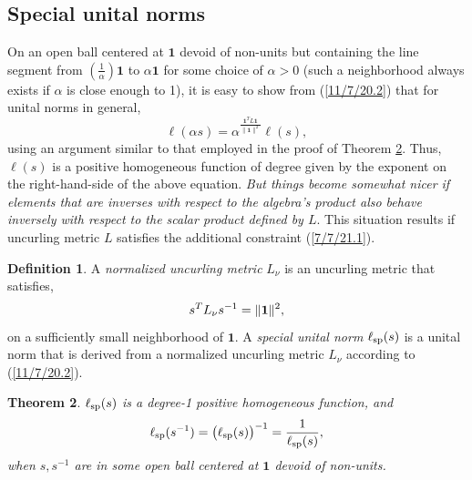 \documentclass{amsart}
\numberwithin{equation}{section}
\newtheorem{theorem}{Theorem}
\theoremstyle{definition}
\newtheorem{definition}[theorem]{Definition}
\numberwithin{theorem}{section}
\begin{document}
\subsection{Special unital norms}

On an open ball centered at $\mathbf{1}$ devoid of non-units but containing the line segment from $\left(\frac{1}{\alpha}\right)\mathbf{1}$ to $\alpha\mathbf{1}$ for some choice of $\alpha>0$ (such a neighborhood always exists if $\alpha$ is close enough to 1), it is easy to show from (\ref{11/7/20.2}) that for unital norms in general,  \[  \ell(\alpha s) = \alpha^{\frac{\mathbf{1}^T L \mathbf{1}}{\|\mathbf{1}\|^2}} \ell(s),\] using an argument similar to that employed in the proof of Theorem \ref{9/24/23.1}. Thus, $ \ell(s)$ is a positive homogeneous function of degree given by the exponent on the right-hand-side of the above equation.  
   {\it But things become somewhat nicer if elements that are inverses with respect to the algebra's product also behave inversely with respect to the scalar product defined by $L$}.  
    This situation results if uncurling metric $L$ satisfies the additional constraint (\ref{7/7/21.1}).
 
\begin{definition}\label{9/20/23.1} A {\it normalized uncurling metric} $L_{\nu}$ is an uncurling metric that satisfies, \begin{equation} \label{7/7/21.1} s^TL_{\nu} s^{-1} =\|{\bf 1}\|^2,\end{equation} on a sufficiently small neighborhood of $\mathbf{1}$.   A {\it special unital norm} $\ell_{\rm sp}(s)$ is a unital norm that is derived from a normalized uncurling metric $L_{\nu}$ according to (\ref{11/7/20.2}). 
\end{definition}

\begin{theorem}\label{9/24/23.1} $ \ell_{\rm sp}(s)$ is a degree-1 positive homogeneous function, and
\begin{equation}\label{5/23/23.3}  \ell_{\rm sp}(s^{-1}) = \big(\ell_{\rm sp}(s)\big)^{-1} = \frac{1}{\ell_{\rm sp}(s)}, \end{equation} when $s,s^{-1}$ are in some open ball centered at $\mathbf{1}$ devoid of non-units. \end{theorem}
\end{document}
